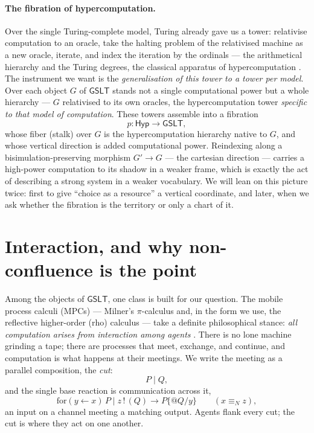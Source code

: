 \documentclass[11pt]{article}
\theoremstyle{definition}
\theoremstyle{plain}
\theoremstyle{remark}
\newcommand{\inn}[3]{\mathrm{for}(#1 \leftarrow #2)\,#3}
\newcommand{\out}[2]{#1\,!\,(#2)}
\newcommand{\reduces}{\longrightarrow}
\newcommand{\Cut}{\mid}
\newcommand{\GSLT}{\mathsf{GSLT}}
\newcommand{\Hyp}{\mathsf{Hyp}}
\begin{document}
\paragraph{The fibration of hypercomputation.}
Over the single Turing-complete model, Turing already gave us a tower: relativise
computation to an oracle, take the halting problem of the relativised machine as a
new oracle, iterate, and index the iteration by the ordinals \cite{turing1939} ---
the arithmetical hierarchy and the Turing degrees, the classical apparatus of
hypercomputation \cite{soare,copeland}. The instrument we want is the
\emph{generalisation of this tower to a tower per model}. Over each object $G$ of
$\GSLT$ stands not a single computational power but a whole hierarchy ---
$G$ relativised to its own oracles, the hypercomputation tower \emph{specific to that
model of computation}. These towers assemble into a fibration
\[
p \colon \Hyp \longrightarrow \GSLT,
\]
whose fiber (stalk) over $G$ is the hypercomputation hierarchy native to $G$, and
whose vertical direction is added computational power. Reindexing along a
bisimulation-preserving morphism $G' \to G$ --- the cartesian direction --- carries
a high-power computation to its shadow in a weaker frame, which is exactly the act
of describing a strong system in a weaker vocabulary. We will lean on this picture
twice: first to give ``choice as a resource'' a vertical coordinate, and later, when
we ask whether the fibration is the territory or only a chart of it.

\section{Interaction, and why non-confluence is the point}\label{sec:interaction}

Among the objects of $\GSLT$, one class is built for our question. The mobile
process calculi (MPCs) --- Milner's $\pi$-calculus and, in the form we use, the
reflective higher-order (rho) calculus \cite{rho} --- take a definite philosophical
stance: \emph{all computation arises from interaction among agents}
\cite{milnerCC}. There is no lone machine grinding a tape; there are processes that
meet, exchange, and continue, and computation is what happens at their meetings. We
write the meeting as a parallel composition, the \emph{cut}:
\[
P \Cut Q,
\]
and the single base reaction is communication across it,
\[
\inn{y}{x}{P} \Cut \out{z}{Q} \reduces P\{@Q/y\} \qquad (x \equiv_N z),
\]
an input on a channel meeting a matching output. Agents flank every cut; the cut is
where they act on one another.
\end{document}

